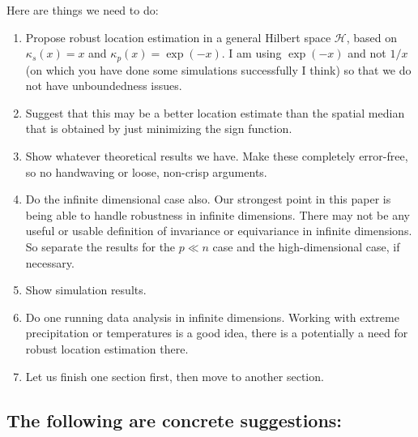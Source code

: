 \documentclass[12pt,letterpaper]{article}
\newcommand{\cH}{\mathcal{H}}
\theoremstyle{Example}
\begin{document}
Here are things we need to do:
\begin{enumerate}

\item Propose robust location estimation in  a general Hilbert space $\cH$, based on 
$\kappa_{s} (x) = x$ and $\kappa_{p} (x) = \exp (-x)$. I am using $\exp (-x)$ and not 
$1/x$ (on which you have done some simulations successfully I think) so that we do 
not have unboundedness issues. 

\item Suggest that this may be a better location estimate than the spatial median 
that is obtained by just minimizing the sign function. 

\item Show whatever theoretical results we have. Make these completely error-free, 
so no handwaving or loose, non-crisp arguments. 

\item Do the infinite dimensional case also. Our strongest point in this paper is being 
able to handle robustness in infinite dimensions. There may not be any useful 
or usable definition of invariance or equivariance in infinite dimensions. So separate 
the results for the $p \ll n$ case and the high-dimensional case, if necessary.

\item Show simulation results. 

\item Do one running data analysis in infinite dimensions. Working with extreme 
precipitation or temperatures is a good idea, there is a potentially a need for robust  
location estimation there. 

\item Let us finish one section first, then move to another section.
\end{enumerate}

\subsection{The following are concrete suggestions:}
\end{document}
